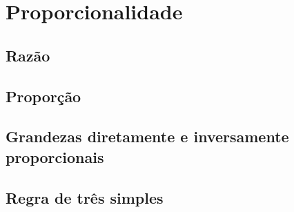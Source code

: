\chapter{Proporcionalidade}
\section{Razão}
\section{Proporção}
\section{Grandezas diretamente e inversamente proporcionais}
\section{Regra de três simples}